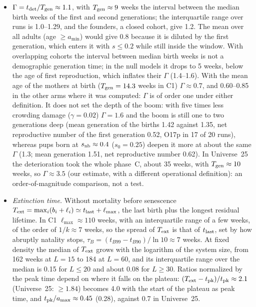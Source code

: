 \begin{itemize}
    daily and the social organization took a whole phase~C, about 35 weeks, to die, so
    $\mathrm{Da}\lesssim4\times10^{-3}$: the spatial structure of the model emerges among animals that are almost
    sessile on the time scale of deterioration, which is not Calhoun's regime. Colonies grow from local nuclei, so the
    peak density falls with $n_0$, from 0.40 at $N_0=400$ to 0.03 for eight founders.
  \item $\Gamma=t_{\rm det}/T_{\rm gen}\approx1.1$, with $T_{\rm gen}\approx9$ weeks the interval between the median
    birth weeks of the first and second generations; the interquartile range over runs is 1.0--1.29, and the
    founders, a closed cohort, give 1.2. The mean over all adults (age $\ge a_{\min}$) would give 0.8
    because it is diluted by the first generation, which enters it with $s\le0.2$ while still inside the window. With
    overlapping cohorts the interval between median birth weeks is not a demographic generation time; in the null
    models it drops to 5 weeks, below the age of first reproduction, which inflates their $\Gamma$ (1.4--1.6). With the
    mean age of the mothers at birth ($T_{\rm gen}=14.3$ weeks in \textsf{C1}) $\Gamma\approx0.7$, and 0.60--0.85 in
    the other arms where it was computed: $\Gamma$ is of order one under either definition. It does not set the depth
    of the boom: with five times less crowding damage ($\gamma=0.02$) $\Gamma=1.6$ and the boom is still one to two
    generations deep (mean generation of the births 1.42 against 1.35, net reproductive number of the first generation
    0.52, O17p in 17 of 20 runs), whereas pups born at $s_{\rm nb}\approx0.4$ ($s_0=0.25$) deepen it more at about the
    same $\Gamma$ (1.3; mean generation 1.51, net reproductive number 0.62). In Universe~25 the deterioration took the
    whole phase~C, about 35 weeks, with $T_{\rm gen}\approx10$ weeks, so $\Gamma\approx3.5$ (our estimate, with a
    different operational definition): an order-of-magnitude comparison, not a test.
  \item \emph{Extinction time.} Without mortality before senescence $T_{\rm ext}=\max_i(b_i+\ell_i)\simeq
    t_{\rm last}+\ell_{\max}$, the last birth plus the longest residual lifetime. In \textsf{C1} $\ell_{\max}\approx110$
    weeks, with an interquartile range of a few weeks, of the order of $1/k\approx7$ weeks, so the spread of
    $T_{\rm ext}$ is that of $t_{\rm last}$, set by how abruptly natality stops,
    $\tau_B=(t_{B99}-t_{B90})/\ln10\approx7$ weeks. At fixed density the median of $T_{\rm ext}$ grows with the
    logarithm of the system size, from 162 weeks at $L=15$ to 184 at $L=60$, and its interquartile range over the
    median is 0.15 for $L\le20$ and about 0.08 for $L\ge30$. Ratios normalized by the peak time depend on where it falls
    on the plateau: $(T_{\rm ext}-t_{\rm pk})/t_{\rm pk}\approx2.1$ (Universe~25: $\ge1.84$) becomes 4.0 with the start
    of the plateau as peak time, and $t_{\rm pk}/a_{\max}\approx0.45$ (0.28), against 0.7 in Universe~25.
\end{itemize}

